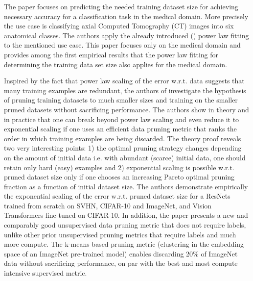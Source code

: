\documentclass{article} %
\begin{document}
The paper \cite{cho2016data} focuses on predicting the needed training dataset size for achieving necessary accuracy for a classification task in the medical domain. More precisely the use case is classifying axial Computed Tomography (CT) images into six anatomical classes. The authors apply the already introduced (\cite{Figueroa2012PredictingSampleSizeForClass}) power law fitting to the mentioned use case. This paper focuses only on the medical domain and provides among the first empirical results that the power law fitting for determining the training data set size also applies for the medical domain.

Inspired by the fact that power law scaling of the error w.r.t. data suggests that many training examples are redundant, the authors of \cite{sorscher2023neural} investigate the hypothesis of pruning training datasets to much smaller sizes and training on the smaller pruned datasets without sacrificing performance. The authors show in theory and in practice that one can break beyond power law scaling and even reduce it to exponential scaling if one uses an efficient data pruning metric that ranks the order in which training examples are being discarded. The theory proof reveals two very interesting points: 1) the optimal pruning strategy changes depending on the amount of initial data i.e. with abundant (scarce) initial data, one should retain only hard (easy) examples and 2) exponential scaling is possible w.r.t. pruned dataset size only if one chooses an increasing Pareto optimal pruning fraction as a function of initial dataset size. The authors demonstrate empirically the exponential scaling of the error w.r.t. pruned dataset size for a ResNets trained from scratch on SVHN, CIFAR-10 and ImageNet, and Vision Transformers fine-tuned on CIFAR-10. In addition, the paper presents a new and comparably good unsupervised data pruning metric that does not require labels, unlike other prior unsupervised pruning metrics that require labels and much more compute. The k-means based pruning metric (clustering in the embedding space of an ImageNet pre-trained model) enables discarding 20\% of ImageNet data without sacrificing performance, on par with the best and most compute intensive supervised metric.
\end{document}
